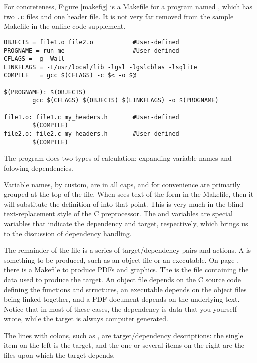 For concreteness, 
Figure \ref{makefig} is a Makefile for a program named ,
which has two {\tt .c} files and one header file. It is not very far
removed from the sample Makefile in the online code supplement.

\begin{figure*}
\begin{verbatim}
OBJECTS = file1.o file2.o           #User-defined
PROGNAME = run_me                   #User-defined
CFLAGS = -g -Wall
LINKFLAGS = -L/usr/local/lib -lgsl -lgslcblas -lsqlite
COMPILE   = gcc $(CFLAGS) -c $< -o $@

$(PROGNAME): $(OBJECTS)
        gcc $(CFLAGS) $(OBJECTS) $(LINKFLAGS) -o $(PROGNAME)

file1.o: file1.c my_headers.h       #User-defined
        $(COMPILE)
file2.o: file2.c my_headers.h       #User-defined
        $(COMPILE)
\end{verbatim}
\caption{A sample Makefile for a program with two source files.}
\label{makefig}
\end{figure*}

The  program does two types of calculation: expanding variable
names and folowing dependencies. 

Variable names, by custom, are in all caps, and for convenience are
primarily grouped at the top of the file. When  sees text of
the form  in the Makefile, then it will substitute the
definition of  into that point. This is very much in the
blind text-replacement style of the C preprocessor. The \ci{\$<} and
 variables are special variables that indicate the dependency
and target, respectively, which brings us to the discussion of
dependency handling.

The remainder of the file is a series of target/dependency pairs and
actions. A  is something to be produced, such as an object
file or an executable. On page \pageref{latexmake}, there is a Makefile
to produce PDFs and graphics. The  is the file
containing the data used to produce the target. An object file depends
on the C source code defining the functions and structures, an
executable depends on the object files being linked together, and a PDF
document depends on the underlying text. Notice that in most of these
cases, the dependency is data that you yourself wrote, while the target is
always computer generated. 

The lines with colons, such as , are
target/dependency descriptions: the single item on the left is the
target, and the one or several items on the right are the files upon
which the target depends.

